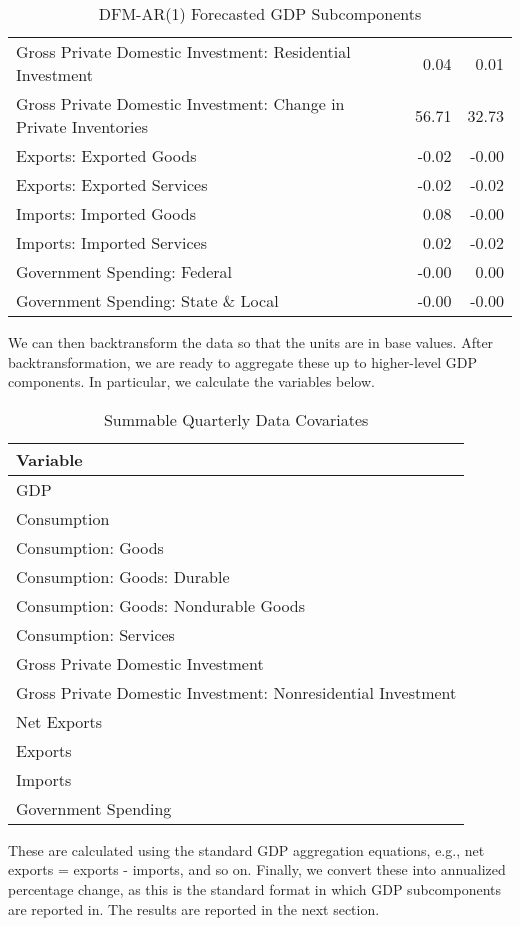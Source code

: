 \documentclass[11pt, letterpaper]{article}\usepackage[]{graphicx}\usepackage[]{color}
\begin{document}
\begin{table}[H]
\begin{tabular}{lrr}
  Gross Private Domestic Investment: Residential Investment & 0.04 & 0.01 \\ 
  Gross Private Domestic Investment: Change in Private Inventories & 56.71 & 32.73 \\ 
  Exports: Exported Goods & -0.02 & -0.00 \\ 
  Exports: Exported Services & -0.02 & -0.02 \\ 
  Imports: Imported Goods & 0.08 & -0.00 \\ 
  Imports: Imported Services & 0.02 & -0.02 \\ 
  Government Spending: Federal & -0.00 & 0.00 \\ 
  Government Spending: State \& Local & -0.00 & -0.00 \\ 
   \hline
\end{tabular}
\endgroup
\caption{DFM-AR(1) Forecasted GDP Subcomponents} 
\end{table}


We can then backtransform the data so that the units are in base values. After backtransformation, we are ready to aggregate these up to higher-level GDP components. In particular, we calculate the variables below.
\begin{table}[H]
\centering
\begingroup\scriptsize
\begin{tabular}{l}
  \hline
Variable \\ 
  \hline
GDP \\ 
  Consumption \\ 
  Consumption: Goods \\ 
  Consumption: Goods: Durable \\ 
  Consumption: Goods: Nondurable Goods \\ 
  Consumption: Services \\ 
  Gross Private Domestic Investment \\ 
  Gross Private Domestic Investment: Nonresidential Investment \\ 
  Net Exports \\ 
  Exports \\ 
  Imports \\ 
  Government Spending \\ 
   \hline
\end{tabular}
\endgroup
\caption{Summable Quarterly Data Covariates} 
\end{table}

These are calculated using the standard GDP aggregation equations, e.g., net exports = exports - imports, and so on.
Finally, we convert these into annualized percentage change, as this is the standard format in which GDP subcomponents are reported in. The results are reported in the next section.
\end{document}

